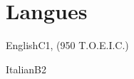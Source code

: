 \section{Langues}

\begin{factlist}
\item{English}{C1, (950 T.O.E.I.C.)}
\item{Italian}{B2}
\end{factlist}